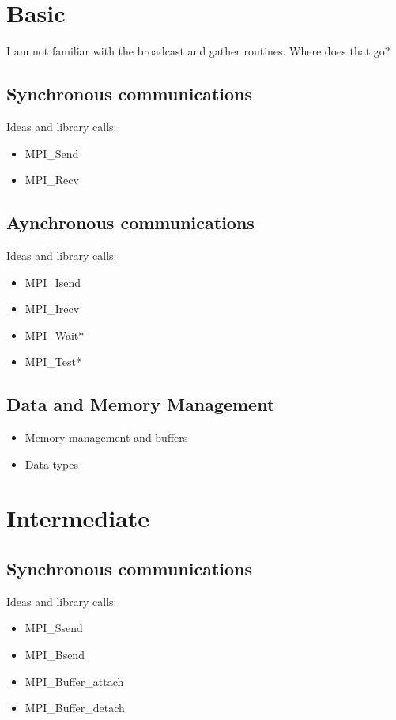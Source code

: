 \section{Basic}

I am not familiar with the broadcast and gather routines. Where does
that go?

\subsection{Synchronous communications}

Ideas and library calls: \\
\begin{itemize}
\item MPI_Send
\item MPI_Recv
\end{itemize}

\subsection{Aynchronous communications}

Ideas and library calls: \\
\begin{itemize}
\item MPI_Isend
\item MPI_Irecv
\item MPI_Wait*
\item MPI_Test*
\end{itemize}

\subsection{Data and Memory Management}

\begin{itemize}
\item Memory management and buffers
\item Data types
\end{itemize}

\section{Intermediate}

\subsection{Synchronous communications}

Ideas and library calls: \\
\begin{itemize}
\item MPI_Ssend
\item MPI_Bsend
\item MPI_Buffer_attach
\item MPI_Buffer_detach 
\end{itemize}

